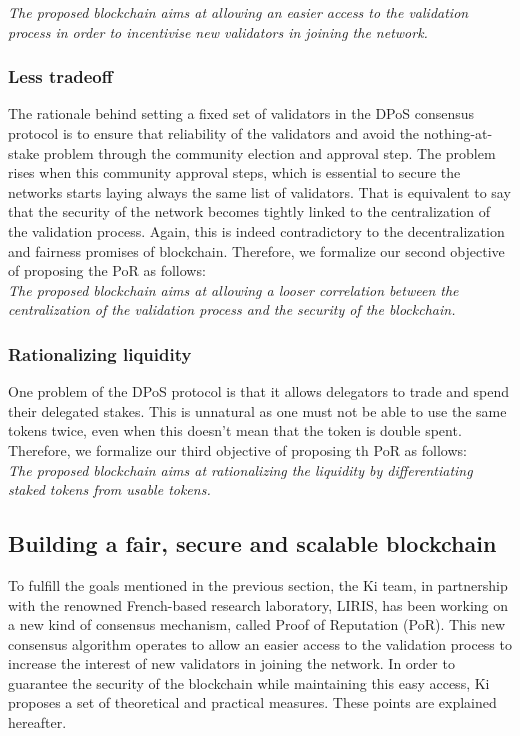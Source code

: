 \textit{The proposed blockchain aims at allowing an easier access to the validation process in order to incentivise new validators in joining the network.}

\subsubsection{Less tradeoff} The rationale behind setting a fixed set of validators in the DPoS consensus protocol is to ensure that reliability of the validators and avoid the nothing-at-stake problem through the community election and approval step. The problem rises when this community approval steps, which is essential to secure the networks starts laying always the same list of validators. That is equivalent to say that the security of the network becomes tightly linked to the centralization of the validation process. Again, this is indeed contradictory to the decentralization and fairness promises of blockchain. Therefore, we formalize our second objective of proposing the PoR as follows:\\

\textit{The proposed blockchain aims at allowing a looser correlation between the centralization of the validation process and the security of the blockchain. }

\subsubsection{Rationalizing liquidity} One problem of the DPoS protocol is that it allows delegators to trade and spend their delegated stakes. This is unnatural as one must not be able to use the same tokens twice, even when this doesn't mean that the token is double spent. Therefore, we formalize our third objective of proposing th PoR as follows:\\

\textit{The proposed blockchain aims at rationalizing the liquidity by differentiating staked tokens from usable tokens. }

\subsection{Building a fair, secure and scalable blockchain}
To fulfill the goals mentioned in the previous section, the Ki team, in partnership with the renowned French-based research laboratory, LIRIS, has been working on a new kind of consensus mechanism, called Proof of Reputation (PoR). This new consensus algorithm operates to allow an easier access to the validation process to increase the interest of new validators in joining the network. In order to guarantee the security of the blockchain while maintaining this easy access, Ki proposes a set of theoretical and practical measures. These points are explained hereafter.

